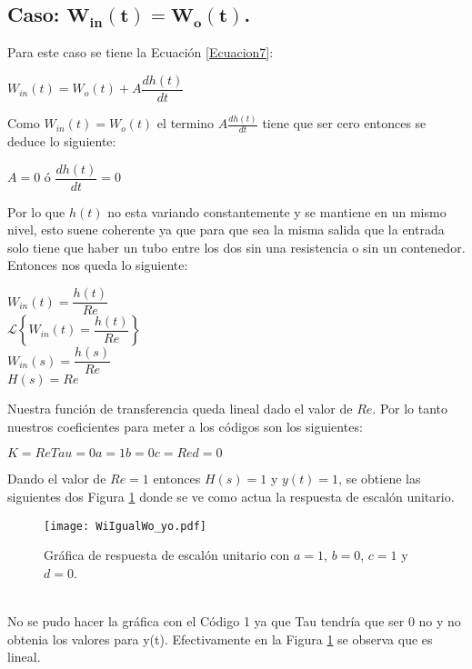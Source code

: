 \documentclass[12pt,a4paper]{article}
\begin{document}
\subsection{Caso: $\mathbf{W_{in}(t) = W_{o}(t)}$.}
Para este caso se tiene la Ecuación \ref{Ecuacion7}:
\begin{center}
$W_{in}(t) = W_{o}(t) + A\dfrac{dh(t)}{dt}$
\end{center}
Como $W_{in}(t) = W_{o}(t)$ el termino $A\frac{dh(t)}{dt}$ tiene que ser cero entonces se deduce lo siguiente:
\begin{center}
$A = 0$ \hspace{2cm} ó \hspace{2cm} $\dfrac{dh(t)}{dt} = 0$
\end{center}
Por lo que $h(t)$ no esta variando constantemente y se mantiene en un mismo nivel, esto suene coherente ya que para que sea la misma salida que la entrada solo tiene que haber un tubo entre los dos sin una resistencia o sin un contenedor. Entonces nos queda lo siguiente:
\begin{center}
$W_{in}(t) = \dfrac{h(t)}{Re}$\\[12pt]
$\mathcal{L}\left\lbrace W_{in}(t) = \dfrac{h(t)}{Re}\right\rbrace$\\[12pt]
$W_{in}(s) = \dfrac{h(s)}{Re}$\\[12pt]
$H(s) = Re$
\end{center}
Nuestra función de transferencia queda lineal dado el valor de $Re$. Por lo tanto nuestros coeficientes para meter a los códigos son los siguientes:
\begin{center}
$K = Re$\hspace{3cm}$Tau = 0$\hspace{3cm}$a= 1$\hspace{3cm}$b = 0$\hspace{3cm}$c = Re$\hspace{3cm}$d = 0$
\end{center} 
Dando el valor de $Re = 1$ entonces $H(s) = 1$ y $y(t) = 1$, se obtiene las siguientes dos Figura \ref{Figura5} donde se ve como actua la respuesta de escalón unitario.\\[12pt]
\begin{figure}[h!] 
\centering
\texttt{[image: WiIgualWo\_yo.pdf]}
\caption{Gráfica de respuesta de escalón unitario con $a = 1$, $b = 0$, $c = 1$ y $d = 0$.}
\label{Figura5}
\end{figure}\\
No se pudo hacer la gráfica con el Código 1 ya que Tau tendría que ser 0 no y no obtenia los valores para y(t). Efectivamente en la Figura \ref{Figura5} se observa que es lineal.
\end{document}
